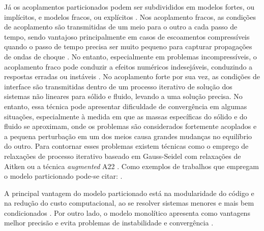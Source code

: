 Já os acoplamentos particionados podem ser subdivididos em modelos fortes, ou implícitos, e modelos fracos, ou explícitos \cite{Felippaetal2001}. Nos acoplamento fracos, as condições de acoplamento são transmitidas de um meio para o outro a cada passo de tempo, sendo vantajoso principalmente em casos de escoamentos compressíveis quando o passo de tempo precisa ser muito pequeno para capturar propagações de ondas de choque \cite{sanches2011acoplamento,sanches2014fluid,sanches2013unconstrained}. No entanto, especialmente em problemas incompressíveis, o acoplamento fraco pode conduzir a efeitos numéricos indesejáveis, conduzindo a respostas erradas ou instáveis \cite{Felippaetal2001, fernandes2019ale}. No acoplamento forte por sua vez, as condições de interface são transmitidas dentro de um processo iterativo de solução dos sistemas não lineares para sólido e fluido, levando a uma solução precisa. No entanto, essa técnica pode apresentar dificuldade de convergência em algumas situações, especialmente à medida em que as massas específicas do sólido e do fluido se aproximam, onde os problemas são considerados fortemente acoplados e a pequena perturbação em um dos meios causa grandes mudanças no equilíbrio do outro. Para contornar esses problemas existem técnicas como o emprego de relaxações de processo iterativo baseado em Gauss-Seidel com relaxações de Aitken \cite{fernandes2019ale} ou a técnica \textit{augmented} A22 \cite{tezduyar2005finite}. Como exemplos de trabalhos que empregam o modelo particionado pode-se citar: .

A principal vantagem do modelo particionado está na modularidade do código e na redução do custo computacional, ao se resolver sistemas menores e mais bem condicionados \cite{sanches2011acoplamento,fernandes2020tecnica}. Por outro lado, o modelo monolítico apresenta como vantagens melhor precisão e evita problemas de instabilidade e convergência \cite{Avancini2023formulacao}.